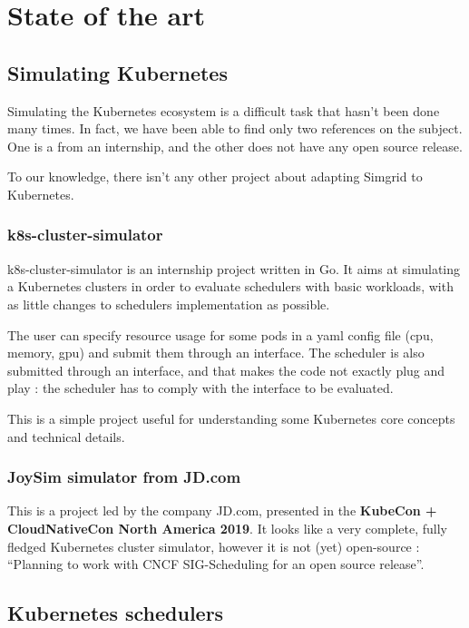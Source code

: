 \documentclass[12pt]{report}
\begin{document}
\chapter{State of the art}

\section{Simulating Kubernetes}

Simulating the Kubernetes ecosystem is a difficult task that hasn't been done
many times. In fact, we have been able to find only two references on the
subject. One is a from an internship, and the other does not have any open
source release.

To our knowledge, there isn't any other project about adapting Simgrid to
Kubernetes.

\subsection{k8s-cluster-simulator}

k8s-cluster-simulator\cite{kubesim} is an internship project written in Go. It
aims at simulating a Kubernetes clusters in order to evaluate schedulers with
basic workloads, with as little changes to schedulers implementation as
possible.

The user can specify resource usage for some pods in a yaml config file (cpu,
memory, gpu) and submit them through an interface. The scheduler is also
submitted through an interface, and that makes the code not exactly plug and
play : the scheduler has to comply with the interface to be evaluated.

This is a simple project useful for understanding some Kubernetes core concepts
and technical details.

\subsection{JoySim simulator from JD.com}

This is a project led by the company JD.com, presented in the \textbf{KubeCon +
	CloudNativeCon North America 2019}\cite{joysim}. It looks like a very
complete, fully fledged Kubernetes cluster simulator, however it is not (yet)
open-source : ``Planning to work with CNCF SIG-Scheduling for an open source
release''.

\section{Kubernetes schedulers}
\end{document}
